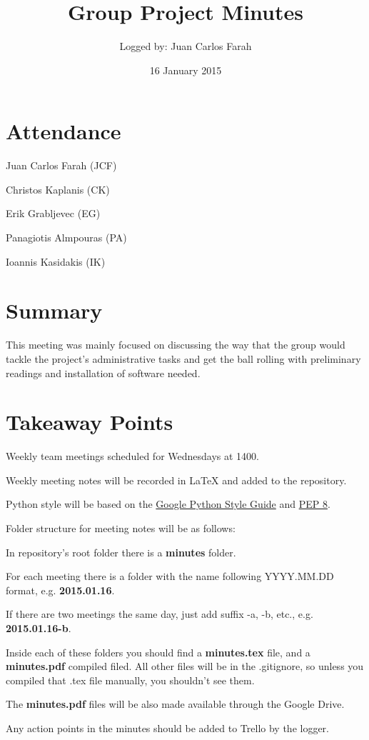 \documentclass{article}
\title{Group Project Minutes}
\author{Logged by: Juan Carlos Farah}
\date{16 January 2015}
\begin{document}
\maketitle

\section*{Attendance}
\begin{compactenum}
\item Juan Carlos Farah (JCF)
\item Christos Kaplanis (CK)
\item Erik Grabljevec (EG)
\item Panagiotis Almpouras (PA)
\item Ioannis Kasidakis (IK)
\end{compactenum}

\section*{Summary}
This meeting was mainly focused on discussing the way that the group would tackle the project's administrative tasks and get the ball rolling with preliminary readings and installation of software needed.

\section*{Takeaway Points}
\begin{compactenum}
\item Weekly team meetings scheduled for Wednesdays at 1400.
\item Weekly meeting notes will be recorded in LaTeX and added to the repository.
\item Python style will be based on the \href{https://google-styleguide.googlecode.com/svn/trunk/pyguide.html}{Google Python Style Guide} and \href{https://www.python.org/dev/peps/pep-0008/}{PEP 8}.
\item Folder structure for meeting notes will be as follows:
	\begin{compactenum}
	\item In repository's root folder there is a \textbf{minutes} folder.
	\item For each meeting there is a folder with the name following YYYY.MM.DD format, e.g. \textbf{2015.01.16}.
	\item If there are two meetings the same day, just add suffix -a, -b, etc., e.g. \textbf{2015.01.16-b}.
	\item Inside each of these folders you should find a \textbf{minutes.tex} file, and a \textbf{minutes.pdf} compiled filed. All other files will be in the .gitignore, so unless you compiled that .tex file manually, you shouldn't see them.
	\end{compactenum}
\item The \textbf{minutes.pdf} files will be also made available through the Google Drive.
\item Any action points in the minutes should be added to Trello by the logger.
\end{compactenum}
\end{document}
